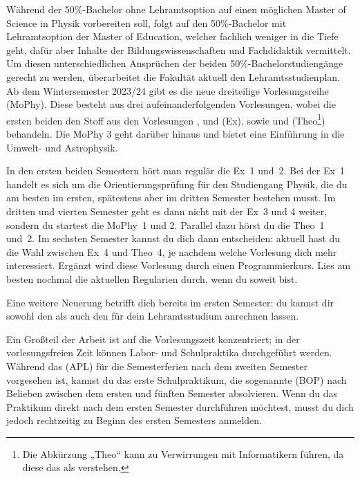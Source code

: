 Während der 50\%-Bachelor ohne Lehramtsoption auf einen möglichen Master of Science in Physik vorbereiten soll, folgt auf den 50\%-Bachelor mit Lehramtsoption der Master of Education, welcher fachlich weniger in die Tiefe geht, dafür aber Inhalte der Bildungswissenschaften und Fachdidaktik vermittelt. Um diesen unterschiedlichen Ansprüchen der beiden 50\%-Bachelorstudiengänge gerecht zu werden, überarbeitet die Fakultät aktuell den Lehramtsstudienplan. Ab dem Wintersemester 2023/24 gibt es die neue dreiteilige Vorlesungsreihe  (\gls{MoPhy}). Diese besteht aus drei aufeinanderfolgenden Vorlesungen, wobei die ersten beiden den Stoff aus den Vorlesungen ,  und  (\gls{Ex}), sowie  und  (\gls{Theo}\footnote{Die Abkürzung „Theo“ kann zu Verwirrungen mit Informatikern führen, da diese das als  verstehen.}) behandeln. Die \gls{MoPhy} 3 geht darüber hinaus und bietet eine Einführung in die Umwelt- und Astrophysik.

In den ersten beiden Semestern hört man regulär die Ex~1 und~2. Bei der Ex~1 handelt es sich um die Orientierungsprüfung für den Studiengang Physik, die du am besten im ersten, spätestens aber im dritten Semester bestehen musst. Im dritten und vierten Semester geht es dann nicht mit der Ex~3 und 4 weiter, sondern du startest die MoPhy~1 und 2. Parallel dazu hörst du die Theo~1 und~2. Im sechsten Semester kannst du dich dann entscheiden: aktuell hast du die Wahl zwischen Ex~4 und Theo~4, je nachdem welche Vorlesung dich mehr interessiert. Ergänzt wird diese Vorlesung durch einen Programmierkurs. Lies am besten nochmal die aktuellen Regularien durch, wenn du soweit bist.

Eine weitere Neuerung betrifft dich bereits im ersten Semester: du kannst dir sowohl den  als auch den  für dein Lehramtsstudium anrechnen lassen. 

Ein Großteil der Arbeit ist auf die Vorlesungszeit konzentriert; in der vorlesungsfreien Zeit können Labor- und Schulpraktika durchgeführt werden. Während das  (APL) für die Semesterferien nach dem zweiten Semester vorgesehen ist, kannst du das erste Schulpraktikum, die sogenannte  (\gls{BOP}) nach Belieben zwischen dem ersten und fünften Semester absolvieren. Wenn du das Praktikum direkt nach dem ersten Semester durchführen möchtest, musst du dich jedoch rechtzeitig zu Beginn des ersten Semesters anmelden.

